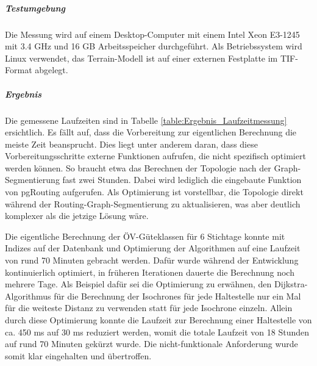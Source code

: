 \subparagraph{Testumgebung}
Die Messung wird auf einem Desktop-Computer mit einem Intel Xeon E3-1245 mit 3.4 GHz und 16 GB Arbeitsspeicher durchgeführt.
Als Betriebssystem wird Linux verwendet, das Terrain-Modell ist auf einer externen Festplatte im TIF-Format abgelegt.

\subparagraph{Ergebnis}

Die gemessene Laufzeiten sind in Tabelle \ref{table:Ergebnis_Laufzeitmessung} ersichtlich.
Es fällt auf, dass die Vorbereitung zur eigentlichen Berechnung die meiste Zeit beansprucht.
Dies liegt unter anderem daran, dass diese Vorbereitungsschritte externe Funktionen aufrufen, die nicht spezifisch optimiert werden können.
So braucht etwa das Berechnen der Topologie nach der Graph-Segmentierung fast zwei Stunden.
Dabei wird lediglich die eingebaute Funktion von pgRouting aufgerufen.
Als Optimierung ist vorstellbar, die Topologie direkt während der Routing-Graph-Segmentierung zu aktualisieren, was aber deutlich komplexer als die jetzige Lösung wäre.

Die eigentliche Berechnung der \acs{ÖV}-Güteklassen für 6 Stichtage konnte mit Indizes auf der Datenbank und Optimierung der Algorithmen auf eine Laufzeit von rund 70 Minuten gebracht werden.
Dafür wurde während der Entwicklung kontinuierlich optimiert, in früheren Iterationen dauerte die Berechnung noch mehrere Tage.
Als Beispiel dafür sei die Optimierung zu erwähnen, den Dijkstra-Algorithmus für die Berechnung der \glspl{Isochrone} für jede Haltestelle nur ein Mal für die weiteste Distanz zu verwenden statt für jede \gls{Isochrone} einzeln.
Allein durch diese Optimierung konnte die Laufzeit zur Berechnung einer Haltestelle von ca. 450 ms auf 30 ms reduziert werden, womit die totale Laufzeit von 18 Stunden auf rund 70 Minuten gekürzt wurde.
Die nicht-funktionale Anforderung  wurde somit klar eingehalten und übertroffen.

